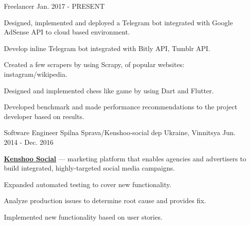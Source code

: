 

\begin{cventries}

  \cventry
  	{Freelancer}
  	{}
	{}
	{Jan. 2017 - PRESENT}
	{
		\begin{cvitems}
			\item {Designed, implemented and deployed a Telegram bot integrated with Google AdSense API to cloud based environment.} 
			\item {Develop inline Telegram bot integrated with Bitly API, Tumblr API.}
			\item {Created a few scrapers by using Scrapy, of popular websites: instagram/wikipedia.}
			\item {Designed and implemented chess like game by using Dart and Flutter.}
			\item {Developed benchmark and made performance recommendations to the project developer based on results.}
		\end{cvitems}
	}
  \cventry
  	{Software Engineer}
  	{Spilna Sprava/Kenshoo-social dep}
	{Ukraine, Vinnitsya}
	{Jun. 2014 - Dec. 2016}
	{ 
		\textbf{\href{https://social.kenshoo.com}{Kenshoo Social}} --- marketing platform that enables agencies and advertisers to build integrated, highly-targeted social media campaigns. %
        \hfill \break
		\begin{cvitems}
			\item {Expanded  automated testing to cover new functionality.}
			\item {Analyze production issues to determine root cause and provides fix.}
			\item {Implemented new functionality based on user stories.}
		\end{cvitems}
	}	
\end{cventries}